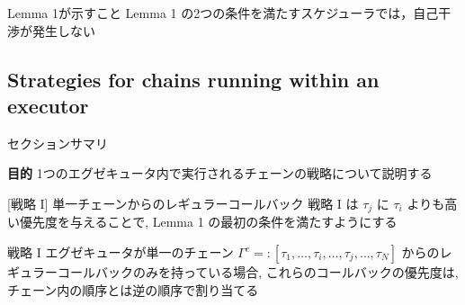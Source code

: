 \begin{frame}{Lemma 1が示すこと}
    Lemma 1 の2つの条件を満たすスケジューラでは，自己干渉が発生しない
\end{frame}




\subsection{Strategies for chains running within an executor}
\label{ssec: strategies for chains running within an executor}

\begin{frame}{セクションサマリ}
    \begin{itembox}[l]{\textbf{目的}}
        1つのエグゼキュータ内で実行されるチェーンの戦略について説明する
    \end{itembox}
\end{frame}

\begin{frame}{}
\end{frame}

\begin{frame}[label=strategy1]{[戦略 I] 単一チェーンからのレギュラーコールバック}
    戦略 I は $\tau_{j}$ に $\tau_{i}$ よりも高い優先度を与えることで, Lemma 1 の最初の条件を満たすようにする
    \begin{block}{戦略 I}
        エグゼキュータが単一のチェーン $\Gamma^{c}=:\left[\tau_{1}, \ldots, \tau_{i}, \ldots, \tau_{j}, \ldots, \tau_{N}\right]$ からのレギュラーコールバックのみを持っている場合, これらのコールバックの優先度は, チェーン内の順序とは逆の順序で割り当てる
    \end{block}
\end{frame}


